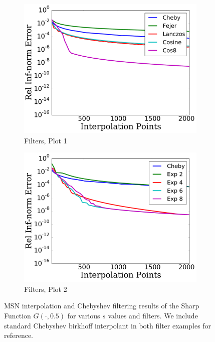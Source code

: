 \begin{figure}[p]
    \begin{subfigure}{0.45\textwidth}
    \includegraphics[width=\textwidth]{plots/cheby_birkhoff_filter_rough_sharp_func.pdf}
    \caption{Filters, Plot 1}
    \end{subfigure}
    \begin{subfigure}{0.45\textwidth}
    \includegraphics[width=\textwidth]{plots/cheby_birkhoff_filter_2_rough_sharp_func.pdf}
    \caption{Filters, Plot 2}
    \end{subfigure}
\caption[Rough Birkhoff Interpolation Comparison: Sharp Function]{
MSN interpolation and Chebyshev filtering results of the Sharp Function
$G(\cdot,0.5)$ for various $s$ values and filters.
We include standard Chebyshev birkhoff interpolant in both filter
examples for reference.
}
\label{fig:rough_birkhoff_comparison_sharp_func}
\end{figure}



